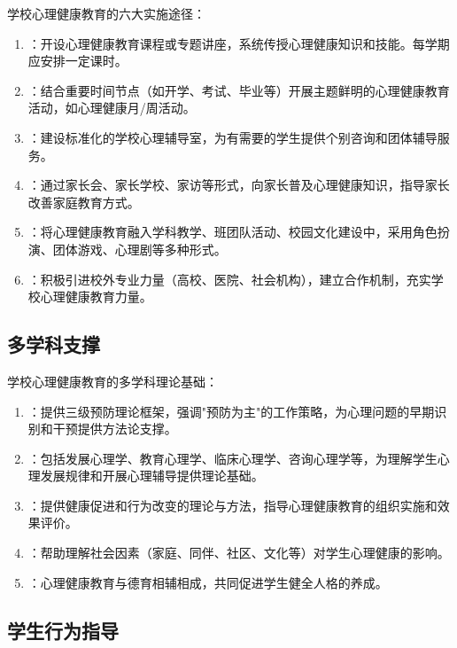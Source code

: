 \begin{keybox}
学校心理健康教育的六大实施途径：

\begin{enumerate}[leftmargin=*]
    \item {}：开设心理健康教育课程或专题讲座，系统传授心理健康知识和技能。每学期应安排一定课时。
    \item {}：结合重要时间节点（如开学、考试、毕业等）开展主题鲜明的心理健康教育活动，如心理健康月/周活动。
    \item {}：建设标准化的学校心理辅导室，为有需要的学生提供个别咨询和团体辅导服务。
    \item {}：通过家长会、家长学校、家访等形式，向家长普及心理健康知识，指导家长改善家庭教育方式。
    \item {}：将心理健康教育融入学科教学、班团队活动、校园文化建设中，采用角色扮演、团体游戏、心理剧等多种形式。
    \item {}：积极引进校外专业力量（高校、医院、社会机构），建立合作机制，充实学校心理健康教育力量。
\end{enumerate}
\end{keybox}

\subsection{多学科支撑}

\begin{defbox}
学校心理健康教育的多学科理论基础：

\begin{enumerate}[leftmargin=*]
    \item {}：提供三级预防理论框架，强调"预防为主"的工作策略，为心理问题的早期识别和干预提供方法论支撑。
    \item {}：包括发展心理学、教育心理学、临床心理学、咨询心理学等，为理解学生心理发展规律和开展心理辅导提供理论基础。
    \item {}：提供健康促进和行为改变的理论与方法，指导心理健康教育的组织实施和效果评价。
    \item {}：帮助理解社会因素（家庭、同伴、社区、文化等）对学生心理健康的影响。
    \item {}：心理健康教育与德育相辅相成，共同促进学生健全人格的养成。
\end{enumerate}
\end{defbox}

\subsection{学生行为指导}

